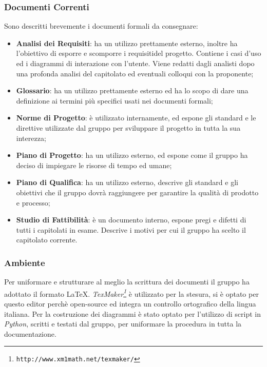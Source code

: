 \subsubsection{Documenti Correnti}\label{ProcessiSupporto_Documentazione_DocumentiCorrenti}
Sono descritti brevemente i documenti formali da consegnare:
\begin{itemize}
	\item \textbf{Analisi dei Requisiti}: ha un utilizzo prettamente esterno, inoltre ha l'obiettivo di esporre e scomporre i requisiti\glossario del progetto. Contiene i casi d'uso ed i diagrammi di interazione con l'utente. Viene redatti dagli analisti dopo una profonda analisi del capitolato ed eventuali colloqui con la proponente; 
	\item \textbf{Glossario}: ha un utilizzo prettamente esterno ed ha lo scopo di dare una definizione ai termini più specifici usati nei documenti formali;
	\item \textbf{Norme di Progetto}: è utilizzato internamente, ed espone gli standard e le direttive utilizzate dal gruppo per sviluppare il progetto in tutta la sua interezza;
	\item \textbf{Piano di Progetto}: ha un utilizzo esterno, ed espone come il gruppo ha deciso di impiegare le risorse di tempo ed umane;
	\item \textbf{Piano di Qualifica}: ha un utilizzo esterno, descrive gli standard e gli obiettivi che il gruppo dovrà raggiungere per garantire la qualità di prodotto e processo;
	\item \textbf{Studio di Fattibilità}: è un documento interno, espone pregi e difetti di tutti i capitolati in esame. Descrive i motivi per cui il gruppo ha scelto il capitolato corrente.
\end{itemize}

\subsubsection{Ambiente}\label{ProcessiSupporto_Documentazione_Ambiente} 
Per uniformare e strutturare al meglio la scrittura dei documenti il gruppo ha adottato il formato \LaTeX. 
\textit{TexMaker\footnote{\texttt{http://www.xm1math.net/texmaker/}}} è utilizzato per la stesura, si è optato per questo editor perchè open-source ed integra un controllo ortografico della lingua italiana. 
Per la costruzione dei diagrammi è stato optato per l'utilizzo di script in \textit{Python}, scritti e testati dal gruppo, per uniformare la procedura in tutta la documentazione.

